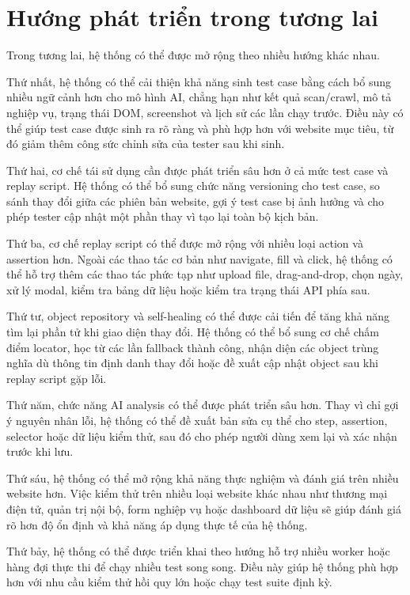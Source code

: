 \section{Hướng phát triển trong tương lai}

Trong tương lai, hệ thống có thể được mở rộng theo nhiều hướng khác nhau.

Thứ nhất, hệ thống có thể cải thiện khả năng sinh test case bằng cách bổ sung nhiều ngữ cảnh hơn cho mô hình AI, chẳng hạn như kết quả scan/crawl, mô tả nghiệp vụ, trạng thái DOM, screenshot và lịch sử các lần chạy trước. Điều này có thể giúp test case được sinh ra rõ ràng và phù hợp hơn với website mục tiêu, từ đó giảm thêm công sức chỉnh sửa của tester sau khi sinh.

Thứ hai, cơ chế tái sử dụng cần được phát triển sâu hơn ở cả mức test case và replay script. Hệ thống có thể bổ sung chức năng versioning cho test case, so sánh thay đổi giữa các phiên bản website, gợi ý test case bị ảnh hưởng và cho phép tester cập nhật một phần thay vì tạo lại toàn bộ kịch bản.

Thứ ba, cơ chế replay script có thể được mở rộng với nhiều loại action và assertion hơn. Ngoài các thao tác cơ bản như navigate, fill và click, hệ thống có thể hỗ trợ thêm các thao tác phức tạp như upload file, drag-and-drop, chọn ngày, xử lý modal, kiểm tra bảng dữ liệu hoặc kiểm tra trạng thái API phía sau.

Thứ tư, object repository và self-healing có thể được cải tiến để tăng khả năng tìm lại phần tử khi giao diện thay đổi. Hệ thống có thể bổ sung cơ chế chấm điểm locator, học từ các lần fallback thành công, nhận diện các object trùng nghĩa dù thông tin định danh thay đổi hoặc đề xuất cập nhật object sau khi replay script gặp lỗi.

Thứ năm, chức năng AI analysis có thể được phát triển sâu hơn. Thay vì chỉ gợi ý nguyên nhân lỗi, hệ thống có thể đề xuất bản sửa cụ thể cho step, assertion, selector hoặc dữ liệu kiểm thử, sau đó cho phép người dùng xem lại và xác nhận trước khi lưu.

Thứ sáu, hệ thống có thể mở rộng khả năng thực nghiệm và đánh giá trên nhiều website hơn. Việc kiểm thử trên nhiều loại website khác nhau như thương mại điện tử, quản trị nội bộ, form nghiệp vụ hoặc dashboard dữ liệu sẽ giúp đánh giá rõ hơn độ ổn định và khả năng áp dụng thực tế của hệ thống.

Thứ bảy, hệ thống có thể được triển khai theo hướng hỗ trợ nhiều worker hoặc hàng đợi thực thi để chạy nhiều test song song. Điều này giúp hệ thống phù hợp hơn với nhu cầu kiểm thử hồi quy lớn hoặc chạy test suite định kỳ.

